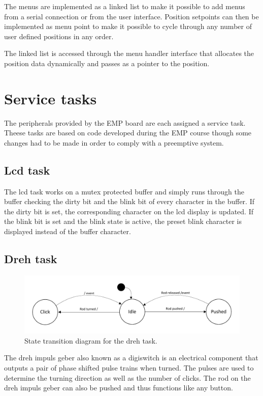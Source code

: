 The menus are implemented as a linked list to make it possible to add menus from a serial connection or from the user interface. Position setpoints can then be implemented as menu point to make it possible to cycle through any number of user defined positions in any order.

The linked list is accessed through the menu handler interface that allocates the position data dynamically and passes as a pointer to the position.

\section{Service tasks}
The peripherals provided by the EMP board are each assigned a service task. Theese tasks are based on code developed during the EMP course though some changes had to be made in order to comply with a preemptive system. 

\subsection{Lcd task}
The lcd task works on a mutex protected buffer and simply runs through the buffer checking the dirty bit and the blink bit of every character in the buffer. If the dirty bit is set, the corresponding character on the lcd display is updated. If the blink bit is set and the blink state is active, the preset blink character is displayed instead of the buffer character.

\subsection{Dreh task}
\begin{figure}[htb]
	\centering
	\includegraphics[width=\textwidth,clip,trim=0 15 0 15]{graphics/dreh_task_fsm.pdf} 
	\caption{State transition diagram for the dreh task.}
	\label{fig:task_dreh_fsm}
\end{figure}
The dreh impuls geber also known as a digiswitch is an electrical component that outputs a pair of phase shifted pulse trains when turned. The pulses are used to determine the turning direction as well as the number of clicks. The rod on the dreh impuls geber can also be pushed and thus functions like any button.

